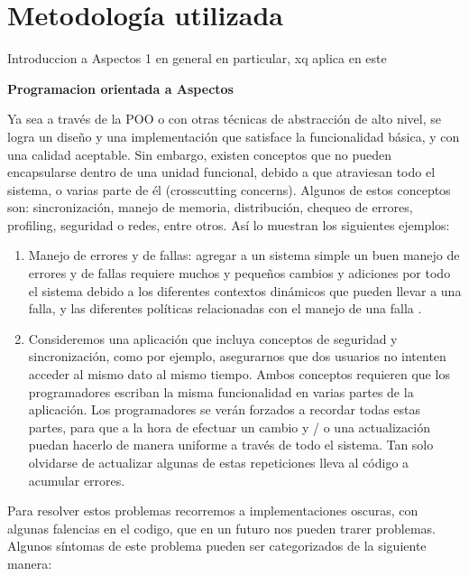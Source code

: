 \section{Metodología utilizada}
\label{sec:Methodology}
Introduccion a Aspectos
		1 en general
		en particular, xq aplica en este

{\bf Programacion orientada a Aspectos }
		
Ya sea a través de la POO o con otras técnicas de abstracción de alto nivel, se
logra un diseño y una implementación que satisface la funcionalidad básica, y con
una calidad aceptable. Sin embargo, existen conceptos que no pueden encapsularse
dentro de una unidad funcional, debido a que atraviesan todo el sistema, o varias
parte de él (crosscutting concerns). Algunos de estos conceptos son: sincronización,
manejo de memoria, distribución, chequeo de errores, profiling, seguridad o redes,
entre otros. Así lo muestran los siguientes ejemplos:

\begin {enumerate}

	\item
	Manejo de errores y de fallas: agregar a un sistema simple un buen
	manejo de errores y de fallas requiere muchos y pequeños cambios y
	adiciones por todo el sistema debido a los diferentes contextos
	dinámicos que pueden llevar a una falla, y las diferentes políticas
	relacionadas con el manejo de una falla \cite{Kicz97a}.
	
	\item
	Consideremos una aplicación que incluya conceptos de seguridad y
	sincronización, como por ejemplo, asegurarnos que dos usuarios no
	intenten acceder al mismo dato al mismo tiempo. Ambos conceptos
	requieren que los programadores escriban la misma funcionalidad en
	varias partes de la aplicación. Los programadores se verán forzados a
	recordar todas estas partes, para que a la hora de efectuar un cambio
	y / o una actualización puedan hacerlo de manera uniforme a través
	de todo el sistema. Tan solo olvidarse de actualizar algunas de estas
	repeticiones lleva al código a acumular errores. \cite{Aquila}

\end{enumerate}

Para resolver estos problemas  recorremos a implementaciones oscuras, con
algunas falencias en el codigo, que en un futuro nos pueden trarer problemas.
Algunos síntomas de este problema pueden ser categorizados de la siguiente manera:

